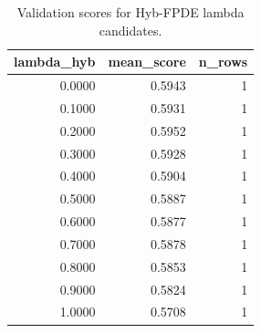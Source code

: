 \begin{table}[t]
\caption{Validation scores for Hyb-FPDE lambda candidates.}
\label{tab:lambda_distribution_computed}
\centering
\begin{tabular}{rrr}
\toprule
lambda\_hyb & mean\_score & n\_rows \\
\midrule
0.0000 & 0.5943 & 1 \\
0.1000 & 0.5931 & 1 \\
0.2000 & 0.5952 & 1 \\
0.3000 & 0.5928 & 1 \\
0.4000 & 0.5904 & 1 \\
0.5000 & 0.5887 & 1 \\
0.6000 & 0.5877 & 1 \\
0.7000 & 0.5878 & 1 \\
0.8000 & 0.5853 & 1 \\
0.9000 & 0.5824 & 1 \\
1.0000 & 0.5708 & 1 \\
\bottomrule
\end{tabular}

\end{table}
